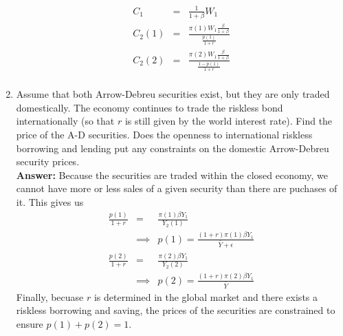 \documentclass[11pt]{SelfArxOneColBMN}
\begin{document}
\begin{enumerate}
  \begin{eqnarray*}
    C_1 &=&\frac{1}{1 + \beta}W_1\\
    C_2(1) &=& \frac{\pi(1)W_1\frac{\beta}{1+\beta}}{\frac{p(1)}{1 + r}}\\
    C_2(2) &=& \frac{\pi(2)W_1\frac{\beta}{1+\beta}}{\frac{1 - p(1)}{1 + r}}\\
  \end{eqnarray*} 
  \item Assume that both Arrow-Debreu securities exist, but they are only traded domestically. The economy continues to trade the riskless bond internationally (so that $r$ is still given by the world interest rate). Find the price of the A-D securities. Does the openness to international riskless borrowing and lending put any constraints on the domestic Arrow-Debreu security prices.\\
  \textbf{Answer: }Because the securities are traded within the closed economy, we cannot have more or less sales of a given security than there are puchases of it. This gives us
  \begin{eqnarray*}
  \frac{p(1)}{1 + r} &=& \frac{\pi(1)\beta Y_1}{Y_2(1)}\\
  &\implies& p(1) = \frac{(1+r)\pi(1)\beta Y_1}{\bar{Y} + \epsilon}\\
  \frac{p(2)}{1 + r} &=& \frac{\pi(2)\beta Y_1}{Y_2(2)}\\
  &\implies& p(2) = \frac{(1+r)\pi(2)\beta Y_1}{\bar{Y}}
  \end{eqnarray*}
  Finally, becuase $r$ is determined in the global market and there exists a riskless borrowing and saving, the prices of the securities are constrained to ensure $p(1) + p(2) = 1$.
\end{enumerate}
\end{document}
